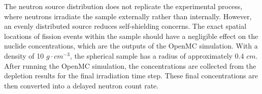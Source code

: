 The neutron source distribution does not replicate the experimental process, where neutrons irradiate the sample externally rather than internally.
However, an evenly distributed source reduces self-shielding concerns.
The exact spatial locations of fission events within the sample should have a negligible effect on the nuclide concentrations, which are the outputs of the OpenMC simulation.
With a density of 10 $g \cdot cm^{-3}$, the spherical sample has a radius of approximately 0.4 $cm$.
After running the OpenMC simulation, the concentrations are collected from the depletion results for the final irradiation time step.
These final concentrations are then converted into a delayed neutron count rate.
